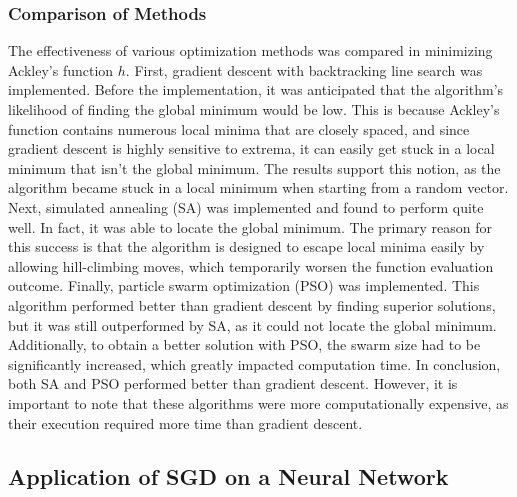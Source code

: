 \subsubsection{Comparison of Methods}
The effectiveness of various optimization methods was compared in minimizing Ackley's function $h$. First, gradient descent with backtracking line search was implemented. Before the implementation, it was anticipated that the algorithm's likelihood of finding the global minimum would be low. This is because Ackley's function contains numerous local minima that are closely spaced, and since gradient descent is highly sensitive to extrema, it can easily get stuck in a local minimum that isn't the global minimum. The results support this notion, as the algorithm became stuck in a local minimum when starting from a random vector. Next, simulated annealing (SA) was implemented and found to perform quite well. In fact, it was able to locate the global minimum. The primary reason for this success is that the algorithm is designed to escape local minima easily by allowing hill-climbing moves, which temporarily worsen the function evaluation outcome. Finally, particle swarm optimization (PSO) was implemented. This algorithm performed better than gradient descent by finding superior solutions, but it was still outperformed by SA, as it could not locate the global minimum. Additionally, to obtain a better solution with PSO, the swarm size had to be significantly increased, which greatly impacted computation time. In conclusion, both SA and PSO performed better than gradient descent. However, it is important to note that these algorithms were more computationally expensive, as their execution required more time than gradient descent.

\subsection{Application of SGD on a Neural Network}

